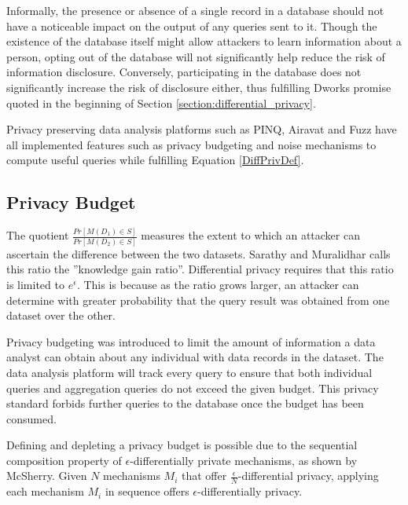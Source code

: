 Informally, the presence or absence of a single record in a database should not have a noticeable impact on the output of any queries sent to it. Though the existence of the database itself might allow attackers to learn information about a person, opting out of the database will not significantly help reduce the risk of information disclosure. Conversely, participating in the database does not significantly increase the risk of disclosure either, thus fulfilling Dworks promise quoted in the beginning of Section \ref{section:differential_privacy}.

Privacy preserving data analysis platforms such as PINQ\cite{mcsherry2009PINQ}, Airavat\cite{roy2010airavat} and Fuzz\cite{Haeberlen2011fuzz} have all implemented features such as privacy budgeting and noise mechanisms to compute useful queries while fulfilling Equation \ref{DiffPrivDef}.

\subsection{Privacy Budget}
\label{section:privacy_budget}
The quotient $\frac{Pr[M(D_1)\in S]}{Pr[M(D_2)\in S]}$ measures the extent to which an attacker can ascertain the difference between the two datasets\cite{abowd2008protective}. Sarathy and Muralidhar\cite{Sarathy2011evaluating} calls this ratio the ''knowledge gain ratio''. Differential privacy requires that this ratio is limited to $e^\epsilon$. This is because as the ratio grows larger, an attacker can determine with greater probability that the query result was obtained from one dataset over the other.

Privacy budgeting was introduced to limit the amount of information a data analyst can obtain about any individual with data records in the dataset. The data analysis platform will track every query to ensure that both individual queries and aggregation queries do not exceed the given budget. This privacy standard forbids further queries to the database once the budget has been consumed. 

Defining and depleting a privacy budget is possible due to the sequential composition property of $\epsilon$-differentially private mechanisms, as shown by McSherry\cite{mcsherry2009PINQ}. Given $N$ mechanisms $M_i$ that offer $\frac{\epsilon}{N}$-differential privacy, applying each mechanism $M_i$ in sequence offers $\epsilon$-differentially privacy.



